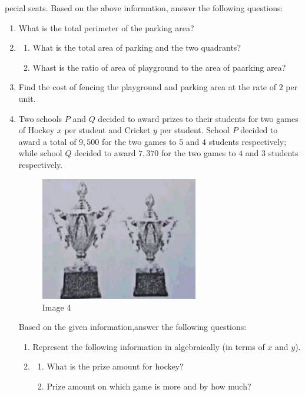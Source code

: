 \documentclass[12pt,-letter paper]{article}
\begin{document}
\begin{enumerate}
pecial seats.
Based on the above information, answer the following questions:
\begin{enumerate}
\item
What is the total perimeter of the parking area?
\item
\begin{enumerate}
\item
What is the total area of parking and the two quadrants?
\item
Whast is the ratio of area of playground to the area of paarking area?
\end{enumerate}
\item
Find the cost of fencing the playground and parking area at the rate of \rupee $2$ per unit.
\newpage
\item
Two schools $P$ and $Q$ decided to award prizes to their students for two games of Hockey \rupee $x$ per student and Cricket \rupee $y$ per student. School $P$ decided to award a total of \rupee $9,500$ for the two games to $5$ and $4$ students respectively; while school $Q$ decided to award
 \rupee $7,370$ for the two games to $4$ and $3$ students respectively.
\begin{figure}[h!]
\centering
\includegraphics[width=0.65\textwidth]{img4.jpg}
\caption{Image 4}
\end{figure}
Based on the given information,answer the following questions:
\begin{enumerate}
\item
Represent the following information in algebraically (in terms of $x$ and $y$).
\item
\begin{enumerate}
\item
What is the prize amount for hockey?
\item
Prize amount on which game is more and by how much?
\end{enumerate}

\end{enumerate}
\end{enumerate}
\end{enumerate}
\end{document}
